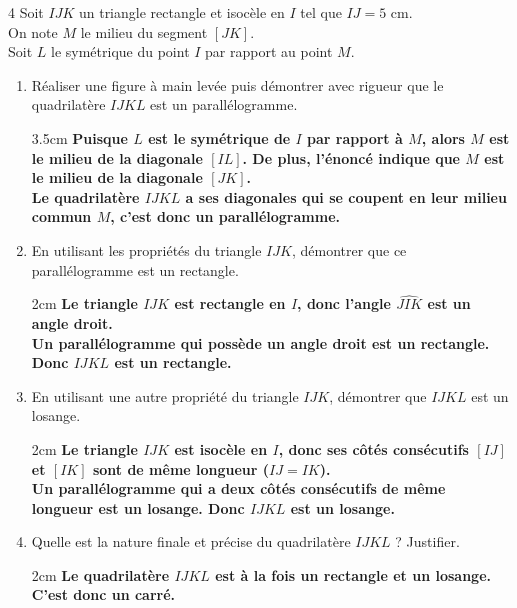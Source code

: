 \documentclass[a4paper]{book}
\begin{document}
{    \begin{exerciceNote}{4}
        Soit $IJK$ un triangle rectangle et isocèle en $I$ tel que $IJ = 5\text{ cm}$. \\
        On note $M$ le milieu du segment $[JK]$. \\
        Soit $L$ le symétrique du point $I$ par rapport au point $M$.
    
        \begin{enumerate}
            \item Réaliser une figure à main levée puis démontrer avec rigueur que le quadrilatère $IJKL$ est un parallélogramme.
            \begin{ZoneReponse}{3.5cm}
                \color{red}\bfseries
                Puisque $L$ est le symétrique de $I$ par rapport à $M$, alors $M$ est le milieu de la diagonale $[IL]$. De plus, l'énoncé indique que $M$ est le milieu de la diagonale $[JK]$.\\
                Le quadrilatère $IJKL$ a ses diagonales qui se coupent en leur milieu commun $M$, c'est donc un parallélogramme.
            \end{ZoneReponse}
            
            \item En utilisant les propriétés du triangle $IJK$, démontrer que ce parallélogramme est un rectangle.
            \begin{ZoneReponse}{2cm}
                \color{red}\bfseries
                Le triangle $IJK$ est rectangle en $I$, donc l'angle $\widehat{JIK}$ est un angle droit.\\
                Un parallélogramme qui possède un angle droit est un rectangle. Donc $IJKL$ est un rectangle.
            \end{ZoneReponse}
            
            \item En utilisant une autre propriété du triangle $IJK$, démontrer que $IJKL$ est un losange.
            \begin{ZoneReponse}{2cm}
                \color{red}\bfseries
                Le triangle $IJK$ est isocèle en $I$, donc ses côtés consécutifs $[IJ]$ et $[IK]$ sont de même longueur ($IJ=IK$).\\
                Un parallélogramme qui a deux côtés consécutifs de même longueur est un losange. Donc $IJKL$ est un losange.
            \end{ZoneReponse}
            
            \item Quelle est la nature finale et précise du quadrilatère $IJKL$ ? Justifier.
            \begin{ZoneReponse}{2cm}
                \color{red}\bfseries
                Le quadrilatère $IJKL$ est à la fois un rectangle et un losange. C'est donc un carré.
            \end{ZoneReponse}
        \end{enumerate}
    \end{exerciceNote}
}
\end{document}

